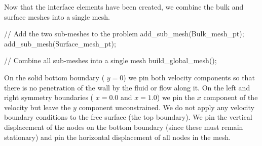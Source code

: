 Now that the interface elements have been created, we combine the bulk and surface meshes into a single mesh.


\begin{DoxyCodeInclude}
 \textcolor{comment}{// Add the two sub-meshes to the problem}
 add\_sub\_mesh(Bulk\_mesh\_pt);
 add\_sub\_mesh(Surface\_mesh\_pt);

 \textcolor{comment}{// Combine all sub-meshes into a single mesh}
 build\_global\_mesh();

\end{DoxyCodeInclude}


On the solid bottom boundary ( $ y = 0 $) we pin both velocity components so that there is no penetration of the wall by the fluid or flow along it. On the left and right symmetry boundaries ( $ x = 0.0 $ and $ x = 1.0 $) we pin the $ x $ component of the velocity but leave the $ y $ component unconstrained. We do not apply any velocity boundary conditions to the free surface (the top boundary). We pin the vertical displacement of the nodes on the bottom boundary (since these must remain stationary) and pin the horizontal displacement of all nodes in the mesh.


